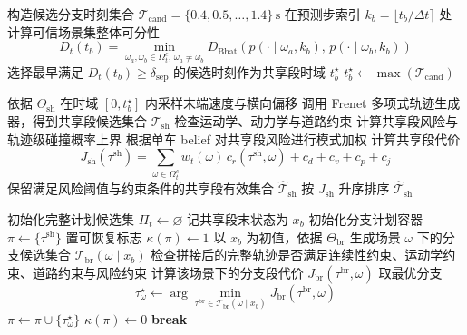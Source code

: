 \begin{algorithm}[t]
\begin{algorithmic}[1]
    \State 构造候选分支时刻集合 $\mathcal{T}_{\mathrm{cand}}=\{0.4,0.5,\ldots,1.4\}\,\mathrm{s}$
        \State 在预测步索引 $k_b=\lfloor t_b/\Delta t \rceil$ 处计算可信场景集整体可分性
        \[
            D_t(t_b) = \min_{\omega_a,\omega_b \in \Omega_t^{c},\, \omega_a \neq \omega_b}
            D_{\mathrm{Bhat}}\!\left(p(\cdot\mid\omega_a,k_b),\, p(\cdot\mid\omega_b,k_b)\right)
        \]
    \EndFor
    \State 选择最早满足 $D_t(t_b)\ge \delta_{\mathrm{sep}}$ 的候选时刻作为共享段时域 $t_b^{\star}$
        \State $t_b^{\star} \gets \max(\mathcal{T}_{\mathrm{cand}})$
    \EndIf

    \State 依据 $\Theta_{\mathrm{sh}}$ 在时域 $[0,t_b^{\star}]$ 内采样末端速度与横向偏移
    \State 调用 Frenet 多项式轨迹生成器，得到共享段候选集合 $\mathcal{T}_{\mathrm{sh}}$
        \State 检查运动学、动力学与道路约束
        \State 计算共享段风险与轨迹级碰撞概率上界
        \State 根据单车 belief 对共享段风险进行模式加权
        \State 计算共享段代价
        \[
            J_{\mathrm{sh}}(\tau^{\mathrm{sh}})
            = \sum_{\omega \in \Omega_t^{c}} w_t(\omega)\, c_r(\tau^{\mathrm{sh}},\omega)
            + c_d + c_v + c_p + c_j
        \]
    \EndFor
    \State 保留满足风险阈值与约束条件的共享段有效集合 $\hat{\mathcal{T}}_{\mathrm{sh}}$
    \State 按 $J_{\mathrm{sh}}$ 升序排序 $\hat{\mathcal{T}}_{\mathrm{sh}}$

    \State 初始化完整计划候选集 $\Pi_t \gets \varnothing$
        \State 记共享段末状态为 $x_b$
        \State 初始化分支计划容器 $\pi \gets \{\tau^{\mathrm{sh}}\}$
        \State 置可恢复标志 $\kappa(\pi)\gets 1$
            \State 以 $x_b$ 为初值，依据 $\Theta_{\mathrm{br}}$ 生成场景 $\omega$ 下的分支候选集合 $\mathcal{T}_{\mathrm{br}}(\omega \mid x_b)$
                \State 检查拼接后的完整轨迹是否满足连续性约束、运动学约束、道路约束与风险约束
                \State 计算该场景下的分支段代价 $J_{\mathrm{br}}(\tau^{\mathrm{br}},\omega)$
            \EndFor
                \State 取最优分支
                \[
                    \tau_{\omega}^{\star} \gets \arg\min_{\tau^{\mathrm{br}} \in \mathcal{T}_{\mathrm{br}}(\omega \mid x_b)}
                    J_{\mathrm{br}}(\tau^{\mathrm{br}},\omega)
                \]
                \State $\pi \gets \pi \cup \{\tau_{\omega}^{\star}\}$
            \Else
                \State $\kappa(\pi)\gets 0$
                \State \textbf{break}
            \EndIf
        \EndFor


\end{algorithmic}
\end{algorithm}
